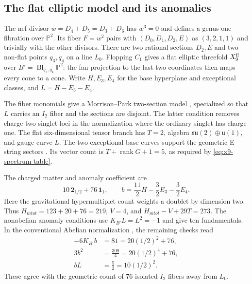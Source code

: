 \subsection{The flat elliptic model and its anomalies}
\label{subsec:sixd}\label{subsec:genus-one}

The nef divisor $w=D_4+D_5=D_3+D_6$ has $w^3=0$ and defines
a genus-one fibration over $\mathbb P^2$. Its fiber $F=w^2$
pairs with $(D_0,D_1,D_2,E)$ as $(3,2,1,1)$ and trivially
with the other divisors. There are two rational sections $D_2,E$
and two non-flat points $q_3,q_4$ on a line $L_0$.
Flopping $C_1$ gives a flat elliptic threefold $X_9^{\rm fl}$
over $B'=\operatorname{Bl}_{q_3,q_4}\mathbb P^2$: the fan
projection to the last two coordinates then maps every cone
to a cone. Write $H,E_3,E_4$ for the base hyperplane and
exceptional classes, and $L=H-E_3-E_4$.

The fiber monomials give a Morrison--Park two-section model
\cite{Morrison:2012ei}, specialized so that $L$ carries an
$I_2$ fiber and the sections are disjoint. The latter condition
removes charge-two singlet loci in the normalization where the
ordinary singlet has charge one. The flat six-dimensional
tensor branch has $T=2$, algebra
$\mathfrak{su}(2)\oplus\mathfrak u(1)$, and gauge curve $L$.
The two exceptional base curves support the geometric E-string
sectors \cite{Ganor:1996pc}. Its vector count is
$T+\operatorname{rank}G+1=5$, as required by
\eqref{eq:x9-spectrum-table}.

The charged matter and anomaly coefficient are
\begin{equation}
 10\,\mathbf2_{1/2}+76\,\mathbf1_1,\qquad
 b=\frac{11}{2}H-\frac32E_3-\frac32E_4.
 \label{eq:x9-height-class}
\end{equation}
Here the gravitational hypermultiplet count weights a doublet
by dimension two. Thus $H_{
m tot}=123+20+76=219$,
$V=4$, and $H_{
m tot}-V+29T=273$.
The nonabelian anomaly conditions use $K_{B'}L=L^2=-1$
and give ten fundamentals. In the conventional Abelian
normalization \cite{Kumar:2010ru,Park:2011ji}, the remaining
checks read
\begin{equation}
\begin{aligned}
 -6K_{B'}b&=81=20(1/2)^2+76,\\
 3b^2&=\frac{309}{4}=20(1/2)^4+76,\\
 bL&=\frac52=10(1/2)^2.
\end{aligned}
\label{eq:x9-abelian-anomaly-checks}
\end{equation}
These agree with the geometric count of $76$ isolated $I_2$
fibers away from $L_0$.

